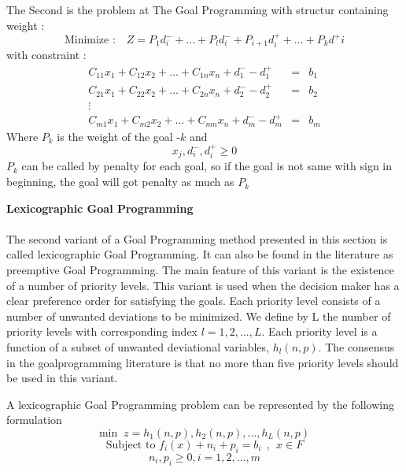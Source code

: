 \documentclass[a4paper, 12pt]{article}
\numberwithin{lemma}{section}
\begin{document}
\begin{itemize}
		\vspace{1cm}
		The Second is the problem at The Goal Programming with structur containing weight :
		\begin{equation*}
		\text{Minimize : }~~~ Z = P_1d^-_i + \dots + P_ld^-_i + P_{i+1}d^+_i +\dots + P_kd^+i
		\end{equation*}
		with constraint :
		\begin{equation*}
		\begin{array}{rcl}
		C_{11}x_1+C_{12}x_2 + \dots + C_{1n}x_n + d^-_1 - d^+_1&=&b_1\\
		C_{21}x_1+C_{22}x_2 + \dots + C_{2n}x_n + d^-_2- d^+_2&=&b_2\\
		\vdots&&\\
		C_{m1}x_1+C_{m2}x_2 + \dots + C_{mn}x_n + d^-_m - d^+_m&=&b_m
		\end{array}
		\end{equation*}
		Where $P_k$ is the weight of the goal -$k$
		and $$x_j,d^-_i,d^+_i \geq 0$$
		$P_k $ can be called by penalty for each goal, so if the goal is not same with sign in beginning, the goal will got penalty as much as $P_k$
	\end{itemize}
	
		
		\newpage
		\textbf{Lexicographic Goal Programming}\\\\
		The second variant of a Goal Programming method presented in this section is called lexicographic Goal Programming. It can also be found in the literature as preemptive Goal Programming. The main feature of this variant is the existence of a number of priority levels. This variant is used when the decision maker has a clear preference order for satisfying the goals. Each priority level consists of a number of unwanted deviations to be minimized. We define by L the number of priority levels with corresponding index $l = 1, 2, \dots , L.$ Each priority level is a function of a subset of unwanted deviational variables, $h_l(n, p)$. The consensus in the goalprogramming literature is that no more than five priority levels should be used in this variant.
		
		A lexicographic Goal Programming problem can be represented by the following
		formulation
		$$\text{min }~z = h_1(n,p),h_2(n,p),\dots,h_L(n,p)$$
		$$\text{Subject to } f_i(x)+n_i+p_i=b_i~~,~~x\in F$$
		$$n_i,p_i \geq 0, i = 1,2,\dots,m$$
		
\end{document}
